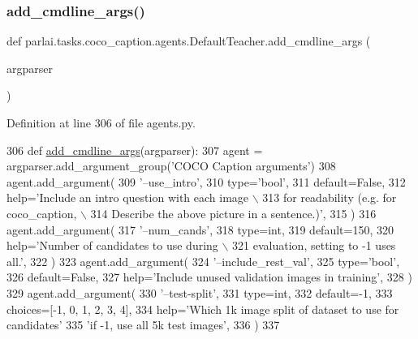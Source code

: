 \subsubsection{\texorpdfstring{add\+\_\+cmdline\+\_\+args()}{add\_cmdline\_args()}}
{\footnotesize\ttfamily def parlai.\+tasks.\+coco\+\_\+caption.\+agents.\+Default\+Teacher.\+add\+\_\+cmdline\+\_\+args (\begin{DoxyParamCaption}\item[{}]{argparser }\end{DoxyParamCaption})\hspace{0.3cm}{\ttfamily [static]}}



Definition at line 306 of file agents.\+py.


\begin{DoxyCode}
306     \textcolor{keyword}{def }\hyperlink{namespaceparlai_1_1agents_1_1drqa_1_1config_a62fdd5554f1da6be0cba185271058320}{add\_cmdline\_args}(argparser):
307         agent = argparser.add\_argument\_group(\textcolor{stringliteral}{'COCO Caption arguments'})
308         agent.add\_argument(
309             \textcolor{stringliteral}{'--use\_intro'},
310             type=\textcolor{stringliteral}{'bool'},
311             default=\textcolor{keyword}{False},
312             help=\textcolor{stringliteral}{'Include an intro question with each image \(\backslash\)}
313 \textcolor{stringliteral}{                                for readability (e.g. for coco\_caption, \(\backslash\)}
314 \textcolor{stringliteral}{                                Describe the above picture in a sentence.)'},
315         )
316         agent.add\_argument(
317             \textcolor{stringliteral}{'--num\_cands'},
318             type=int,
319             default=150,
320             help=\textcolor{stringliteral}{'Number of candidates to use during \(\backslash\)}
321 \textcolor{stringliteral}{                                evaluation, setting to -1 uses all.'},
322         )
323         agent.add\_argument(
324             \textcolor{stringliteral}{'--include\_rest\_val'},
325             type=\textcolor{stringliteral}{'bool'},
326             default=\textcolor{keyword}{False},
327             help=\textcolor{stringliteral}{'Include unused validation images in training'},
328         )
329         agent.add\_argument(
330             \textcolor{stringliteral}{'--test-split'},
331             type=int,
332             default=-1,
333             choices=[-1, 0, 1, 2, 3, 4],
334             help=\textcolor{stringliteral}{'Which 1k image split of dataset to use for candidates'}
335             \textcolor{stringliteral}{'if -1, use all 5k test images'},
336         )
337 
\end{DoxyCode}
\mbox{\label{classparlai_1_1tasks_1_1coco__caption_1_1agents_1_1DefaultTeacher_ac50d86244a0030b91090d7c1ef4d7c72}} 
